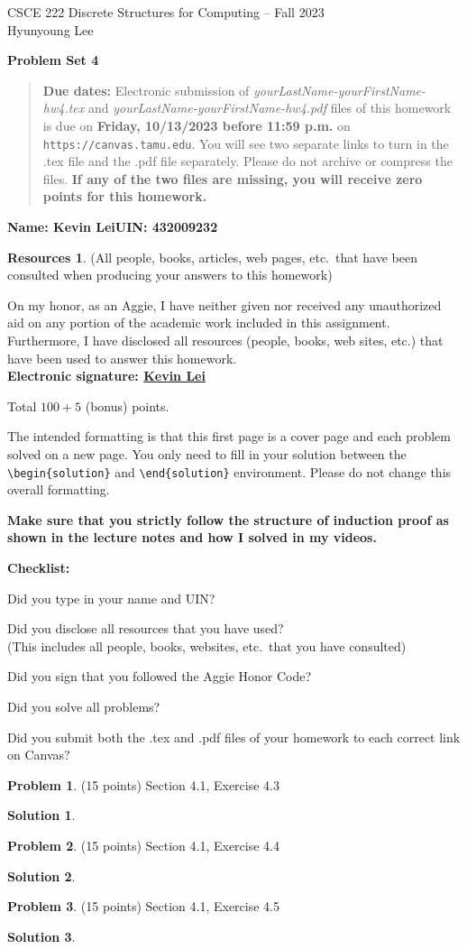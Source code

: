 \documentclass{article}
\theoremstyle{definition}
\newtheorem{problem}{Problem}
\newtheorem*{solution}{Solution}
\newtheorem*{resources}{Resources}
\newcommand{\name}[2]{\noindent\textbf{Name: #1}\hfill \textbf{UIN: #2}
  \newcommand{\myName}{#1}
  \newcommand{\myUIN}{#2}
}
\newcommand{\honor}{\noindent On my honor, as an Aggie, I have neither
  given nor received any unauthorized aid on any portion of the
  academic work included in this assignment. Furthermore, I have
  disclosed all resources (people, books, web sites, etc.) that have
  been used to answer this homework. \\[2ex]
 \textbf{Electronic signature: \underline{Kevin Lei} } } %
\newcommand{\checklist}{\noindent\textbf{Checklist:}
\begin{compactitem}[$\Box$] 
\item Did you type in your name and UIN? 
\item Did you disclose all resources that you have used? \\
(This includes all people, books, websites, etc.\ that you have consulted)
\item Did you sign that you followed the Aggie Honor Code? 
\item Did you solve all problems? 
\item Did you submit both the .tex and .pdf files of your homework to each correct link on Canvas? 
\end{compactitem}
}
\newcommand{\problemset}[1]{\begin{center}\textbf{Problem Set #1}\end{center}}
\newcommand{\duedate}[1]{\begin{quote}\textbf{Due dates:} Electronic
    submission of \textsl{yourLastName-yourFirstName-hw4.tex} and 
    \textsl{yourLastName-yourFirstName-hw4.pdf} files of this homework is due on
    \textbf{#1} on \texttt{https://canvas.tamu.edu}. You will see two separate links
    to turn in the .tex file and the .pdf file separately. Please do not archive or compress the files.  
    \textbf{If any of the two files are missing, you will receive zero points for this homework.}\end{quote} }
\begin{document}
\begin{center}
{\large
CSCE 222 Discrete Structures for Computing -- Fall 2023\\[.5ex]
Hyunyoung Lee\\}
\end{center}
\problemset{4}
\duedate{Friday, 10/13/2023 before 11:59 p.m.}
\name{Kevin Lei}{432009232} %

\begin{resources} (All people, books, articles, web pages, etc.\ that
  have been consulted when producing your answers to this homework)
\end{resources}
\honor

\bigskip

\noindent
Total $100+5$ (bonus) points.

\bigskip

\noindent
The intended formatting is that this first page is a cover page and each 
problem solved on a new page. You only need to fill in your solution between 
the \verb|\begin{solution}| and \verb|\end{solution}| environment.  
Please do not change this overall formatting.

\bigskip

\noindent
\textbf{Make sure that you strictly follow the structure of induction proof as shown in the 
lecture notes and how I solved in my videos.}

\vfill
\checklist

\newpage
\begin{problem} (15 points) Section 4.1, Exercise 4.3 
\end{problem}
\begin{solution}
\end{solution}

\newpage
\begin{problem} (15 points) Section 4.1, Exercise 4.4 
\end{problem}
\begin{solution}
\end{solution}

\newpage
\begin{problem} (15 points) Section 4.1, Exercise 4.5 
\end{problem}
\begin{solution}
\end{solution}
\end{document}
